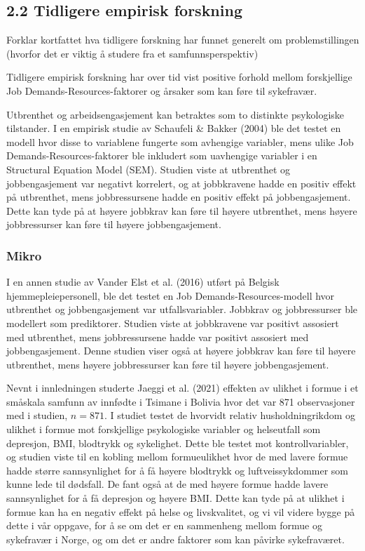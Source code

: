 \documentclass[
  12pt,
  a4paper,
  DIV=11,
  numbers=noendperiod]{scrartcl}
\begin{document}
\subsection{2.2 Tidligere empirisk
forskning}\label{tidligere-empirisk-forskning}

Forklar kortfattet hva tidligere forskning har funnet generelt om
problemstillingen (hvorfor det er viktig å studere fra et
samfunnsperspektiv)

Tidligere empirisk forskning har over tid vist positive forhold mellom
forskjellige Job Demands-Resources-faktorer og årsaker som kan føre til
sykefravær.

Utbrenthet og arbeidsengasjement kan betraktes som to distinkte
psykologiske tilstander. I en empirisk studie av Schaufeli \& Bakker
(2004) ble det testet en modell hvor disse to variablene fungerte som
avhengige variabler, mens ulike Job Demands-Resources-faktorer ble
inkludert som uavhengige variabler i en Structural Equation Model (SEM).
Studien viste at utbrenthet og jobbengasjement var negativt korrelert,
og at jobbkravene hadde en positiv effekt på utbrenthet, mens
jobbressursene hadde en positiv effekt på jobbengasjement. Dette kan
tyde på at høyere jobbkrav kan føre til høyere utbrenthet, mens høyere
jobbressurser kan føre til høyere jobbengasjement.

\subsubsection{Mikro}\label{mikro}

I en annen studie av Vander Elst et al. (2016) utført på Belgisk
hjemmepleiepersonell, ble det testet en Job Demands-Resources-modell
hvor utbrenthet og jobbengasjement var utfallsvariabler. Jobbkrav og
jobbressurser ble modellert som prediktorer. Studien viste at
jobbkravene var positivt assosiert med utbrenthet, mens jobbressursene
hadde var positivt assosiert med jobbengasjement. Denne studien viser
også at høyere jobbkrav kan føre til høyere utbrenthet, mens høyere
jobbressurser kan føre til høyere jobbengasjement.

Nevnt i innledningen studerte Jaeggi et al. (2021) effekten av ulikhet i
formue i et småskala samfunn av innfødte i Tsimane i Bolivia hvor det
var 871 observasjoner med i studien, \(n = 871\). I studiet testet de
hvorvidt relativ husholdningrikdom og ulikhet i formue mot forskjellige
psykologiske variabler og helseutfall som depresjon, BMI, blodtrykk og
sykelighet. Dette ble testet mot kontrollvariabler, og studien viste til
en kobling mellom formueulikhet hvor de med lavere formue hadde større
sannsynlighet for å få høyere blodtrykk og luftveissykdommer som kunne
lede til dødsfall. De fant også at de med høyere formue hadde lavere
sannsynlighet for å få depresjon og høyere BMI. Dette kan tyde på at
ulikhet i formue kan ha en negativ effekt på helse og livskvalitet, og
vi vil videre bygge på dette i vår oppgave, for å se om det er en
sammenheng mellom formue og sykefravær i Norge, og om det er andre
faktorer som kan påvirke sykefraværet.
\end{document}
